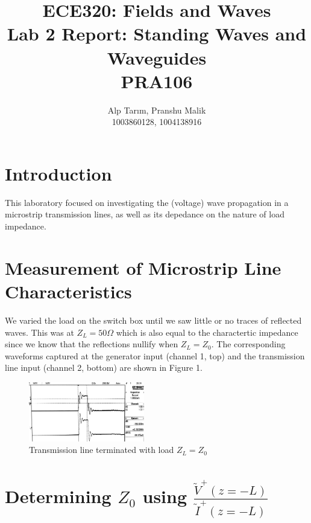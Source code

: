 \documentclass[10pt]{article}
\date{}
\begin{document}
\title{\textbf{\Large{\textsc{ECE320:} Fields and Waves}} \\ \Large{Lab 2 Report: Standing Waves and Waveguides} \\ \textbf{\small{PRA106}}\vspace{-0.3cm}}
\author{Alp Tarım, Pranshu Malik \\ \footnotesize{1003860128}, \footnotesize{1004138916}}

\maketitle

\section{Introduction}

This laboratory focused on investigating the (voltage) wave propagation in a microstrip transmission lines, 
as well as its depedance on the nature of load impedance.

\section{Measurement of Microstrip Line Characteristics}

We varied the load on the switch box until we saw little or no traces of reflected waves.
This was at $Z_L = 50 \Omega$ which is also equal to the charactertic impedance 
since we know that the reflections nullify when $Z_L = Z_0$. The corresponding waveforms
captured at the generator input (channel 1, top) and the transmission line input (channel 2, bottom) 
are shown in Figure 1.

\begin{figure}[h]
    \centering
    \includegraphics[width=0.45\textwidth]{../photos/lab1/load_matched.jpg}
    \caption{Transmission line terminated with load $Z_L = Z_0$\vspace{-0.5cm}}
    \label{tline_matching_z_0}
\end{figure}

\section[Determining Z0 using V/I]{Determining $Z_0$ using $\frac{\tilde V^+(z=-L)}{\tilde I^+(z=-L)}$}
\end{document}
